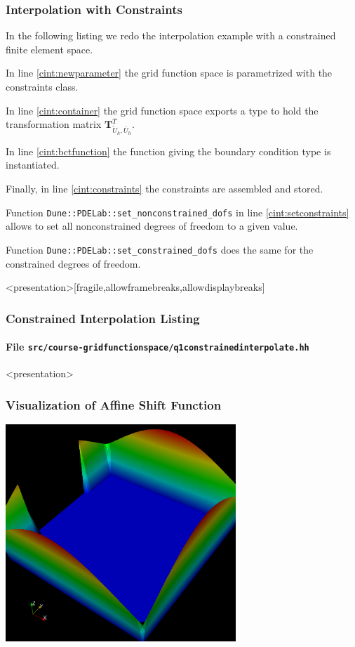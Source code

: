 \begin{frame}
\frametitle<presentation>{Interpolation with Constraints}
In the following listing we redo the interpolation example 
with a constrained finite element space.

In line \ref{cint:newparameter} the grid function space is
parametrized with the constraints class.

In line \ref{cint:container} the grid function space exports a type to
hold the transformation matrix
$\mathbf{T}^T_{\tilde{U}_h,\bar{U}_h}$. 

In line \ref{cint:bctfunction} the function giving the boundary
condition type is instantiated.

Finally, in line \ref{cint:constraints} the constraints are assembled
and stored.

Function \lstinline{Dune::PDELab::set_nonconstrained_dofs} in
line \ref{cint:setconstraints} allows to set all nonconstrained
degrees of freedom to a given value.

Function \lstinline{Dune::PDELab::set_constrained_dofs} does the same
for the constrained degrees of freedom.
\end{frame}


\begin{frame}<presentation>[fragile,allowframebreaks,allowdisplaybreaks]
\frametitle<presentation>{Constrained Interpolation Listing}
\framesubtitle<presentation>{File \texttt{src/course-gridfunctionspace/q1constrainedinterpolate.hh}}

\end{frame}

\begin{frame}<presentation>
\frametitle<presentation>{Visualization of Affine Shift Function}
\begin{center}
\includegraphics[width=0.65\textwidth]{./EPS/q1constrainedinterpolate}
\end{center}
\end{frame}

